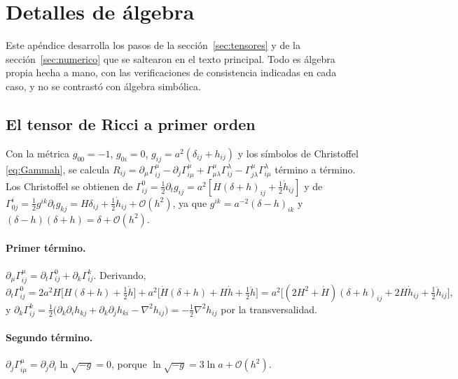 \section{Detalles de álgebra}
\label{ap:algebra}

Este apéndice desarrolla los pasos de la sección~\ref{sec:tensores} y de la sección~\ref{sec:numerico} que se saltearon en el texto principal. Todo es álgebra propia hecha a mano, con las verificaciones de consistencia indicadas en cada caso, y no se contrastó con álgebra simbólica.

\subsection{El tensor de Ricci a primer orden}

Con la métrica $g_{00}=-1$, $g_{0i}=0$, $g_{ij}=a^2(\delta_{ij}+h_{ij})$ y los símbolos de Christoffel \eqref{eq:Gammah}, se calcula $R_{ij}=\partial_\mu\Gamma^\mu_{ij}-\partial_j\Gamma^\mu_{i\mu}+\Gamma^\mu_{\mu\lambda}\Gamma^\lambda_{ij}-\Gamma^\mu_{j\lambda}\Gamma^\lambda_{i\mu}$ término a término. Los Christoffel se obtienen de $\Gamma^0_{ij}=\tfrac12\partial_tg_{ij}=a^2[H(\delta+h)_{ij}+\tfrac12\dot h_{ij}]$ y de $\Gamma^i_{0j}=\tfrac12g^{ik}\partial_tg_{kj}=H\delta_{ij}+\tfrac12\dot h_{ij}+\mathcal O(h^2)$, ya que $g^{ik}=a^{-2}(\delta-h)_{ik}$ y $(\delta-h)(\delta+h)=\delta+\mathcal O(h^2)$.

\paragraph{Primer término.} $\partial_\mu\Gamma^\mu_{ij}=\partial_t\Gamma^0_{ij}+\partial_k\Gamma^k_{ij}$. Derivando,
\begin{equation}
\partial_t\Gamma^0_{ij}=2a^2H\big[H(\delta+h)+\tfrac12\dot h\big]+a^2\big[\dot H(\delta+h)+H\dot h+\tfrac12\ddot h\big]=a^2\big[(2H^2+\dot H)(\delta+h)_{ij}+2H\dot h_{ij}+\tfrac12\ddot h_{ij}\big],
\end{equation}
y $\partial_k\Gamma^k_{ij}=\tfrac12\big(\partial_k\partial_ih_{kj}+\partial_k\partial_jh_{ki}-\nabla^2h_{ij}\big)=-\tfrac12\nabla^2h_{ij}$ por la transversalidad.

\paragraph{Segundo término.} $\partial_j\Gamma^\mu_{i\mu}=\partial_j\partial_i\ln\sqrt{-g}=0$, porque $\ln\sqrt{-g}=3\ln a+\mathcal O(h^2)$.

